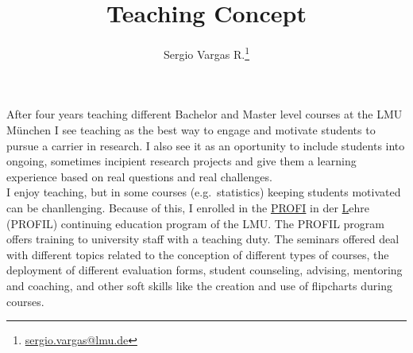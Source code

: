 \documentclass[a4paper,11pt]{article}
\makeatletter
\renewcommand{\maketitle}{\bgroup\setlength{\parindent}{0pt}
\begin{flushleft}
  \thispagestyle{plain}
  \textbf{\@title}

  \@author
\end{flushleft}\egroup
}
\renewenvironment{abstract}
 {\small
  \begin{flushleft}
  \textbf{\abstractname}\vspace{-0.40em}\vspace{0pt}
  \end{flushleft}
  \list{}{
    \setlength{\leftmargin}{0cm}%
    \setlength{\rightmargin}{\leftmargin}%
  }%
  \item\relax}
 {\endlist}
\makeatother
\begin{document}
\title{\Large Teaching Concept\newline}

\author[1]{Sergio Vargas R.\footnote[2]{\href{sergio.vargas@lmu.de}{sergio.vargas@lmu.de}}}


\date{}

\maketitle


After four years teaching different Bachelor and Master level courses at the LMU M\"unchen I see teaching as the best way to engage and motivate students to pursue a carrier in research. I also see it as an oportunity to include students into ongoing, sometimes incipient research projects and give them a learning experience based on real questions and real challenges.\\

I enjoy teaching, but in some courses (e.g.~statistics) keeping students motivated can be chanllenging. Because of this, I enrolled in the \underline{PROFI} in der \underline{L}ehre (PROFIL) continuing education program of the LMU. The PROFIL program offers training to university staff with a teaching duty. The seminars offered deal with different topics related to the conception of different types of courses, the deployment of different evaluation forms, student counseling, advising, mentoring and coaching, and other soft skills like the creation and use of flipcharts during courses.\\
\end{document}
